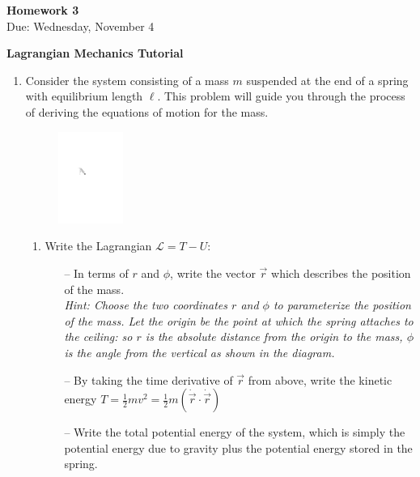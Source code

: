 \documentclass{article}
\begin{document}
\fancyfoot[C]{\thepage}
\vspace*{0cm}
\begin{center}
	{\LARGE \textbf{Homework 3}}\\
	\vspace{0.25cm}
	{\Large Due: Wednesday, November 4}
\end{center}

\newcommand{\textbook}{\textit{Giordano}}

{\textbf{Lagrangian Mechanics Tutorial}}
\begin{enumerate}
	\item Consider the system consisting of a mass $m$ suspended at the end of a spring with equilibrium length $\ell$. This problem will guide you through the process of deriving the equations of motion for the mass.
	\begin{figure}[ht!]
		\centering
		\includegraphics[width=0.2\textwidth]{spring}
	\end{figure}
	\begin{enumerate}
		\item Write the Lagrangian $\mathcal{L}=T-U$:
		\begin{enumerate}
			\item[--] In terms of $r$ and $\phi$, write the vector $\vec{r}$ which describes the position of the mass.\\ \textit{Hint: Choose the two coordinates $r$ and $\phi$ to parameterize the position of the mass. Let the origin be the point at which the spring attaches to the ceiling: so $r$ is the absolute distance from the origin to the mass, $\phi$ is the angle from the vertical as shown in the diagram.}
			\item[--] By taking the time derivative of $\vec{r}$ from above, write the kinetic energy $T=\frac{1}{2}mv^2=\frac{1}{2}m\left(\dot{\vec{r}}\cdot\dot{\vec{r}}\right)$
			\item[--] Write the total potential energy of the system, which is simply the potential energy due to gravity plus the potential energy stored in the spring.

\end{enumerate}
\end{enumerate}
\end{enumerate}
\end{document}
